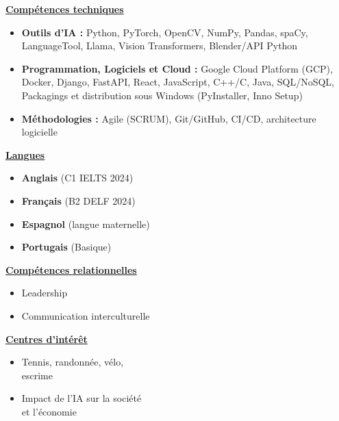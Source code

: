 \documentclass[letterpaper,10pt]{article}
\begin{document}
\noindent
\begin{minipage}[t]{0.39\textwidth}
  \raggedright
  \textbf{\underline{Compétences techniques}}\\[-2pt]
  {\scriptsize
    \begin{itemize}[leftmargin=*,itemsep=1pt,parsep=0pt,topsep=0pt,partopsep=0pt]
      \item \textbf{Outils d'IA :} Python, PyTorch, OpenCV, NumPy, Pandas, spaCy, LanguageTool, Llama, Vision Transformers, Blender/API Python
      \item \textbf{Programmation, Logiciels et Cloud :} Google Cloud Platform (GCP), Docker, Django, FastAPI, 
        React, JavaScript, C++/C, Java, SQL/NoSQL, Packagings et distribution sous Windows (PyInstaller, Inno Setup)
      \item \textbf{Méthodologies :} Agile (SCRUM), Git/GitHub, CI/CD, architecture logicielle
    \end{itemize}
  }
\end{minipage}\hfill
\begin{minipage}[t]{0.28\textwidth}
  \raggedright
  \textbf{\underline{Langues}}\\[-2pt]
  {\scriptsize
    \begin{itemize}[leftmargin=*,itemsep=0pt,parsep=0pt,topsep=0pt,partopsep=0pt]
      \item \textbf{Anglais} (C1 \textendash{} IELTS 2024)
      \item \textbf{Français} (B2 \textendash{} DELF 2024)
      \item \textbf{Espagnol} (langue maternelle)
      \item \textbf{Portugais} (Basique)
    \end{itemize}
  }

  \vspace{0.12cm}
  \textbf{\underline{Compétences relationnelles}}\\[-2pt]
  {\scriptsize
    \begin{itemize}[leftmargin=*,itemsep=1pt,parsep=0pt,topsep=0pt,partopsep=0pt]
      \item Leadership
      \item Communication interculturelle
    \end{itemize}
  }
\end{minipage}\hfill
\begin{minipage}[t]{0.28\textwidth}
  \raggedright
  \textbf{\underline{Centres d'intérêt}}\\[-2pt]
  {\scriptsize
    \begin{itemize}[leftmargin=*,itemsep=1pt,parsep=0pt,topsep=0pt,partopsep=0pt]
      \item Tennis, randonnée, vélo, \\escrime
      \item Impact de l'IA sur la société \\et l'économie
    \end{itemize}
  }
\end{minipage}



\end{document}

